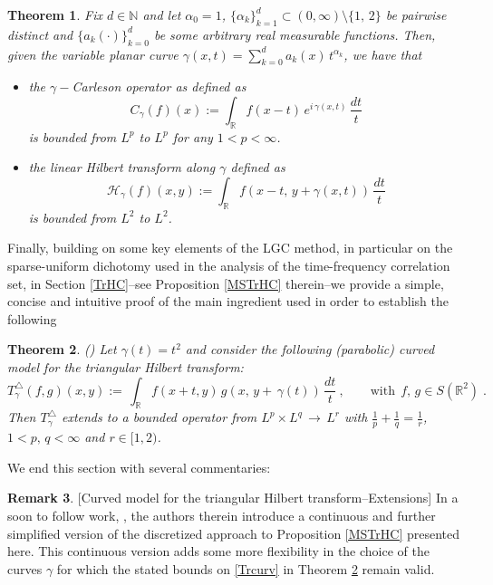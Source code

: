 \documentclass[a4paper,reqno]{amsart}
\numberwithin{equation}{section}
\newtheorem{theorem}{Theorem}[section]
\theoremstyle{definition}
\newtheorem{remark}[theorem]{Remark}
\newcommand{\R}{\mathbb{R}}
\newcommand{\N}{\mathbb{N}}
\def\a{\alpha}
\def\g{\gamma}
\def\H{\mathcal{H}}
\begin{document}
\begin{theorem}\label{main4} Fix $d\in\N$ and let $\a_0=1$, $\{\a_k\}_{k=1}^d\subset (0,\infty)\setminus\{1,\,2\}$ be pairwise distinct and $\{a_k(\cdot)\}_{k=0}^{d}$ be some arbitrary real measurable functions. Then, given the variable planar curve $\g(x,t)=\sum_{k=0}^d a_k(x)\,t^{\a_k}$, we have that
\begin{itemize}
\item the $\g-$Carleson operator as defined as
		\begin{equation}\label{C-gamma}
			C_{\g}(f)(x):=\int_{\R} f(x-t)\,e^{i\,\g(x,t)}\,\frac{dt}{t}
		\end{equation}
is bounded from $L^p$ to $L^p$ for any $1<p<\infty$.
\item the linear Hilbert transform along $\g$ defined as
		\begin{equation}\label{HL-gamma}
			\H_{\g}(f)(x,y):= \int_{\R} f(x-t,\, y+\g(x,t))\,\frac{dt}{t}
		\end{equation}
is bounded from $L^2$ to $L^2$.		
\end{itemize}
\end{theorem}

Finally, building on some key elements of the LGC method, in particular on the sparse-uniform dichotomy used in the analysis of the time-frequency correlation set, in Section \ref{TrHC}--see Proposition \ref{MSTrHC} therein--we provide a simple, concise and intuitive proof of the main ingredient used in order to establish the following

\begin{theorem}  (\cite{CDR20}) \label{consec} Let $\g(t)=t^2$ and consider the following (parabolic) curved model for the triangular Hilbert transform:
	\begin{equation}\label{Trcurv}
		T^{\bigtriangleup}_{\g}(f,g)(x,y):=\,\int_{\R} f(x+t, y)\, g(x,\,y+\,\g(t))\,\frac{dt}{t}\:,\qquad\textrm{with}\:\:f,\,g\in S(\R^2)\;.
	\end{equation}
	Then $T^{\bigtriangleup}_{\g}$ extends to a bounded operator from $L^p\times L^q\,\rightarrow\,L^r$ with $\frac{1}{p}+\frac{1}{q}=\frac{1}{r}$, $1<p,\,q<\infty$ and $r\in[1,2)$.
\end{theorem}

We end this section with several commentaries:


\begin{remark} \label{ExtTr}[\textsf{Curved model for the triangular Hilbert transform--Extensions}] In a soon to follow work, \cite{HsL24}, the authors therein introduce a continuous and further simplified version of the discretized approach to Proposition \ref{MSTrHC} presented here. This continuous version adds some more flexibility in the choice of the curves $\g$ for which the stated bounds on \eqref{Trcurv} in Theorem \ref{consec} remain valid.
\end{remark}
\end{document}
